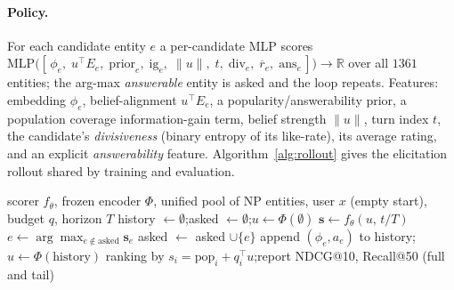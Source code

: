 \documentclass[11pt]{article}
\newcommand{\R}{\mathbb{R}}
\begin{document}
\paragraph{Policy.} For each candidate entity $e$ a per-candidate MLP scores
$\mathrm{MLP}\!\big([\,\phi_e,\; u^\top E_e,\; \mathrm{prior}_e,\; \mathrm{ig}_e,\; \lVert u\rVert,\; t,\;
\mathrm{div}_e,\; \overline{r}_e,\; \mathrm{ans}_e\,]\big)\!\to\!\R$ over all $1361$ entities; the arg-max
\emph{answerable} entity is asked and the loop repeats. Features: embedding $\phi_e$, belief-alignment $u^\top E_e$, a
popularity/answerability prior, a population coverage information-gain term, belief strength $\lVert u\rVert$, turn
index $t$, the candidate's \emph{divisiveness} (binary entropy of its like-rate), its average rating, and an explicit
\emph{answerability} feature. Algorithm~\ref{alg:rollout} gives the elicitation rollout shared by training and
evaluation.

\begin{algorithm}[h]
\caption{CASPER elicitation rollout (shared by training-rollout and evaluation)}\label{alg:rollout}
\begin{algorithmic}[1]
\Require scorer $f_\theta$, frozen encoder $\Phi$, unified pool of $\mathrm{NP}$ entities, user $x$ (empty start), budget $q$, horizon $T$
\State history $\gets\emptyset$;\quad asked $\gets\emptyset$;\quad $u\gets\Phi(\emptyset)$
  \State $\mathbf{s}\gets f_\theta(u,\,t/T)$ 
  \State $e\gets\arg\max_{e\notin\text{asked}}\mathbf{s}_e$ 
  \State asked $\gets$ asked $\cup\{e\}$
     \State append $(\phi_e,a_e)$ to history;\quad $u\gets\Phi(\text{history})$ 
  \EndIf
\EndFor
\State \Return ranking by $s_i=\mathrm{pop}_i+q_i^\top u$;\quad report NDCG@10, Recall@50 (full and tail)
\end{algorithmic}
\end{algorithm}
\end{document}
